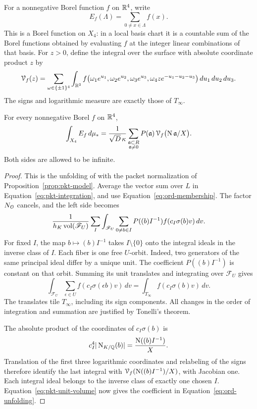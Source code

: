 For a nonnegative Borel function \(f\) on \(\mathbb R^4\), write
\[
 E_f(\Lambda)=\sum_{0\ne x\in\Lambda}f(x).
\]
This is a Borel function on \(X_4\): in a local basis chart it is a
countable sum of the Borel functions obtained by evaluating \(f\) at
the integer linear combinations of that basis.
For \(z>0\), define the integral over the surface with absolute
coordinate product \(z\) by
\begin{equation}\label{eq:ord-fiber}
 \mathcal V_f(z)=
 \sum_{\omega\in\{\pm1\}^4}
 \int_{\mathbb R^3}
 f\bigl(\omega_1e^{u_1},\omega_2e^{u_2},\omega_3e^{u_3},
        \omega_4z e^{-u_1-u_2-u_3}\bigr)\,du_1\,du_2\,du_3 .
\end{equation}
The signs and logarithmic measure are exactly those of \(T_\infty\).

\begin{proposition}\label{prop:ord-unfolding}
For every nonnegative Borel \(f\) on \(\mathbb R^4\),
\begin{equation}\label{eq:ord-unfolding}
 \int_{X_4}E_f\,d\mu_*
 =\frac1{\sqrt D\,\kappa}
   \sum_{\substack{\mathfrak a\subset R\\\mathfrak a\ne0}}
       P(\mathfrak a)\,
       \mathcal V_f\bigl(\operatorname{N}\mathfrak a/X\bigr).
\end{equation}
Both sides are allowed to be infinite.
\end{proposition}

\begin{proof}
This is the unfolding of \cite[Proposition~2.2]{PrimeDegreePackets}
with the packet normalization of Proposition~\ref{prop:pkt-model}.
Average the vector sum over \(L\) in
Equation~\eqref{eq:pkt-integration}, and use
Equation~\eqref{eq:ord-membership}.  The factor \(N_{\mathcal O}\) cancels,
and the left side becomes
\[
 \frac1{h_K\operatorname{vol}(\mathscr F_U)}
 \sum_I\int_{\mathscr F_U}
   \sum_{0\ne b\in I}P((b)I^{-1})f(c_I\sigma(b)v)\,dv .
\]
For fixed \(I\), the map \(b\mapsto(b)I^{-1}\) takes \(I\setminus\{0\}\)
onto the integral ideals in the inverse class of \(I\).  Each fiber
is one free \(U\)-orbit.  Indeed, two generators of the same principal
ideal differ by a unique unit.  The coefficient \(P((b)I^{-1})\) is
constant on that orbit.  Summing its unit translates and integrating
over \(\mathscr F_U\) gives
\[
 \int_{\mathscr F_U}\sum_{\epsilon\in U}
       f(c_I\sigma(\epsilon b)v)\,dv
     =\int_{T_\infty}f(c_I\sigma(b)v)\,dv .
\]
The translates tile \(T_\infty\), including its sign components.
All changes in the order of integration and summation are justified
by Tonelli's theorem.

The absolute product of the coordinates of \(c_I\sigma(b)\) is
\[
 c_I^4|\operatorname{N}_{K/\mathbb Q}(b)|
 =\frac{\operatorname{N}((b)I^{-1})}{X}.
\]
Translation of the first three logarithmic coordinates and relabeling
of the signs therefore identify the last integral with
\(\mathcal V_f(\operatorname{N}((b)I^{-1})/X)\), with Jacobian one.  Each integral
ideal belongs to the inverse class of exactly one chosen \(I\).
Equation~\eqref{eq:pkt-unit-volume} now gives the coefficient in
Equation~\eqref{eq:ord-unfolding}.
\end{proof}

